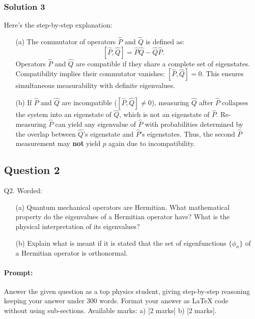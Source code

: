\documentclass{article}
\begin{document}
\subsubsection{Solution 3}
Here's the step-by-step explanation:

\begin{enumerate}
    \item[(a)] The commutator of operators $\hat{P}$ and $\hat{Q}$ is defined as:
    \[
    [\hat{P}, \hat{Q}] = \hat{P}\hat{Q} - \hat{Q}\hat{P}.
    \]
    Operators $\hat{P}$ and $\hat{Q}$ are compatible if they share a complete set of eigenstates. Compatibility implies their commutator vanishes: $[\hat{P}, \hat{Q}] = 0$. This ensures simultaneous measurability with definite eigenvalues.
    
    \item[(b)] If $\hat{P}$ and $\hat{Q}$ are incompatible ($[\hat{P}, \hat{Q}] \neq 0$), measuring $\hat{Q}$ after $\hat{P}$ collapses the system into an eigenstate of $\hat{Q}$, which is not an eigenstate of $\hat{P}$. Re-measuring $\hat{P}$ can yield any eigenvalue of $\hat{P}$ with probabilities determined by the overlap between $\hat{Q}$'s eigenstate and $\hat{P}$'s eigenstates. Thus, the second $\hat{P}$ measurement may \textbf{not} yield $p$ again due to incompatibility.
\end{enumerate}

\subsection{Question 2}
\noindent Q2. Worded:

\begin{enumerate}
    \item[(a)] Quantum mechanical operators are Hermitian. What mathematical property do the eigenvalues of a Hermitian operator have? What is the physical interpretation of its eigenvalues?
    \item[(b)] Explain what is meant if it is stated that the set of eigenfunctions $\{\phi_n\}$ of a Hermitian operator is orthonormal.
\end{enumerate}


\paragraph{Prompt: \\} 
Answer the given question as a top physics student, giving step-by-step reasoning keeping your answer under 300 words. Format your answer as LaTeX code without using sub-sections. Available marks: a) [2 marks] b) [2 marks].
\end{document}
